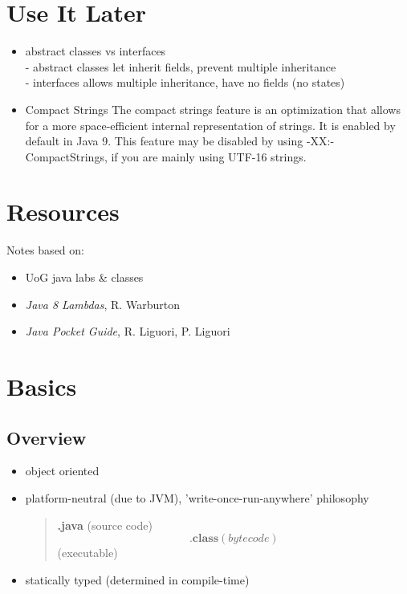 \documentclass{report}
\begin{document}
\chapter{Use It Later}
\begin{itemize}
	\item abstract classes vs interfaces\\
	- abstract classes let inherit fields, prevent multiple inheritance\\
	- interfaces allows multiple inheritance, have no fields (no states)
	\item Compact Strings
The compact strings feature is an optimization that allows for a more space-efficient internal representation of strings. It is enabled by default in Java 9. This feature may be disabled by using -XX:-CompactStrings, if you are mainly using UTF-16 strings.
\end{itemize}

\chapter{Resources}
Notes based on:
\begin{itemize}
	\item UoG java labs \& classes
	\item \textit{Java 8 Lambdas}, R. Warburton
	\item \textit{Java Pocket Guide},  R. Liguori, P. Liguori
\end{itemize}

\chapter{Basics}

\section{Overview}

\begin{itemize}
\item object oriented

\item platform-neutral (due to JVM), 'write-once-run-anywhere' philosophy
\begin{quote}
\textbf{.java} (source code) $$ \textbf{.class} (bytecode) $$ (executable)
\end{quote}
\item statically typed (determined in compile-time)
\end{itemize}
\end{document}
